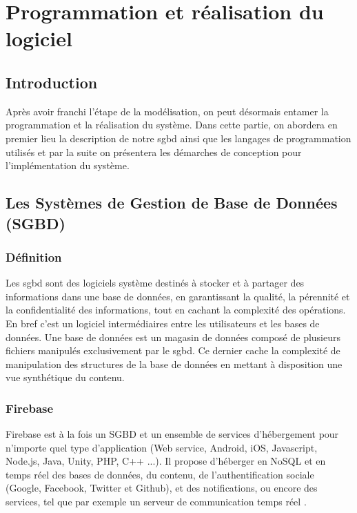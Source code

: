 \chapter{Programmation et réalisation du logiciel}
\minitoc
\newpage
\section{Introduction}
Après avoir franchi l'étape de la modélisation, on peut désormais entamer la programmation et la réalisation du système. Dans cette partie, on abordera en premier lieu la description de notre \gls{sgbd} ainsi que les langages de programmation utilisés et par la suite on présentera les démarches de conception pour l'implémentation du système. 

\section{Les Systèmes de Gestion de Base de Données (SGBD)}
\subsection{Définition}
Les \gls{sgbd} sont des logiciels système destinés à stocker et à partager des informations dans une base de données, en garantissant la qualité, la pérennité et la confidentialité des informations, tout en cachant la complexité des opérations. En bref c'est un logiciel intermédiaires entre les utilisateurs et les bases de données. Une base de données est un magasin de données composé de plusieurs fichiers manipulés exclusivement par le \gls{sgbd}. Ce dernier cache la complexité de manipulation des structures de la base de données en mettant à disposition une vue synthétique du contenu.
\medskip

\subsection{Firebase}
Firebase est à la fois un SGBD et un ensemble de services d'hébergement pour n'importe quel type d'application (Web service, Android, iOS, Javascript, Node.js, Java, Unity, PHP, C++ ...). Il propose d'héberger en NoSQL et en temps réel des bases de données, du contenu, de l'authentification sociale (Google, Facebook, Twitter et Github), et des notifications, ou encore des services, tel que par exemple un serveur de communication temps réel \cite{firebaseWiki}.

